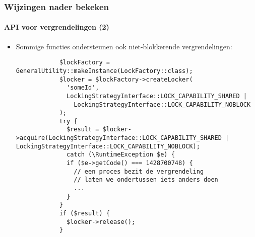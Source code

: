 \begin{frame}[fragile]
	\frametitle{Wijzingen nader bekeken}
	\framesubtitle{API voor vergrendelingen (2)}

	\lstset{basicstyle=\tiny\ttfamily}

	\begin{itemize}

		\item Sommige functies ondersteunen ook niet-blokkerende vergrendelingen:

		\begin{lstlisting}
			$lockFactory = GeneralUtility::makeInstance(LockFactory::class);
			$locker = $lockFactory->createLocker(
			  'someId',
			  LockingStrategyInterface::LOCK_CAPABILITY_SHARED |
			    LockingStrategyInterface::LOCK_CAPABILITY_NOBLOCK
			);
			try {
			  $result = $locker->acquire(LockingStrategyInterface::LOCK_CAPABILITY_SHARED | LockingStrategyInterface::LOCK_CAPABILITY_NOBLOCK);
			  catch (\RuntimeException $e) {
			  if ($e->getCode() === 1428700748) {
			    // een proces bezit de vergrendeling
			    // laten we ondertussen iets anders doen
			    ...
			  }
			}
			if ($result) {
			  $locker->release();
			}
		\end{lstlisting}

	\end{itemize}

\end{frame}

